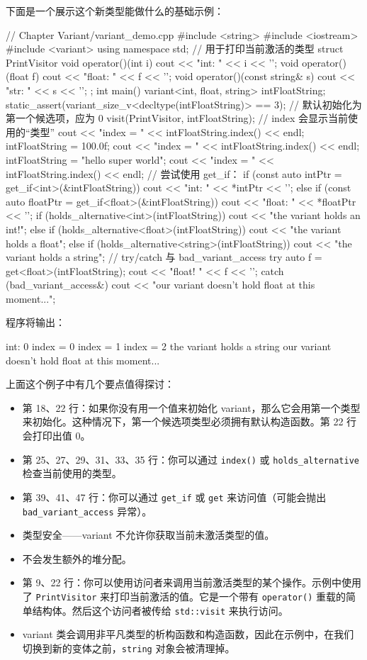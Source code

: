下面是一个展示这个新类型能做什么的基础示例：

\begin{codebox}[cpp]
// Chapter Variant/variant_demo.cpp
#include <string>
#include <iostream>
#include <variant>
using namespace std;
// 用于打印当前激活的类型
struct PrintVisitor
{
void operator()(int i) { cout << "int: " << i << '\n'; }
void operator()(float f) { cout << "float: " << f << '\n'; }
void operator()(const string& s) { cout << "str: " << s << '\n'; }
};
int main()
{
variant<int, float, string> intFloatString;
static_assert(variant_size_v<decltype(intFloatString)> == 3);
// 默认初始化为第一个候选项，应为 0
visit(PrintVisitor{}, intFloatString);
// index 会显示当前使用的“类型”
cout << "index = " << intFloatString.index() << endl;
intFloatString = 100.0f;
cout << "index = " << intFloatString.index() << endl;
intFloatString = "hello super world";
cout << "index = " << intFloatString.index() << endl;
// 尝试使用 get_if：
if (const auto intPtr = get_if<int>(&intFloatString))
cout << "int: " << *intPtr << '\n';
else if (const auto floatPtr = get_if<float>(&intFloatString))
cout << "float: " << *floatPtr << '\n';
if (holds_alternative<int>(intFloatString))
cout << "the variant holds an int!\n";
else if (holds_alternative<float>(intFloatString))
cout << "the variant holds a float\n";
else if (holds_alternative<string>(intFloatString))
cout << "the variant holds a string\n";
// try/catch 与 bad_variant_access
try
{
auto f = get<float>(intFloatString);
cout << "float! " << f << '\n';
}
catch (bad_variant_access&)
{
cout << "our variant doesn't hold float at this moment...\n";
}
}
\end{codebox}

程序将输出：

\begin{codebox}
int: 0
index = 0
index = 1
index = 2
the variant holds a string
our variant doesn't hold float at this moment...
\end{codebox}

上面这个例子中有几个要点值得探讨：

\begin{itemize}
\item 第 18、22 行：如果你没有用一个值来初始化 variant，那么它会用第一个类型来初始化。这种情况下，第一个候选项类型必须拥有默认构造函数。第 22 行会打印出值 0。
\item 第 25、27、29、31、33、35 行：你可以通过 \texttt{index()} 或 \texttt{holds\_alternative} 检查当前使用的类型。
\item 第 39、41、47 行：你可以通过 \texttt{get\_if} 或 \texttt{get} 来访问值（可能会抛出 \texttt{bad\_variant\_access} 异常）。
\item 类型安全——variant 不允许你获取当前未激活类型的值。
\item 不会发生额外的堆分配。
\item 第 9、22 行：你可以使用访问者来调用当前激活类型的某个操作。示例中使用了 \texttt{PrintVisitor} 来打印当前激活的值。它是一个带有 \texttt{operator()} 重载的简单结构体。然后这个访问者被传给 \texttt{std::visit} 来执行访问。
\item variant 类会调用非平凡类型的析构函数和构造函数，因此在示例中，在我们切换到新的变体之前，\texttt{string} 对象会被清理掉。
\end{itemize}

